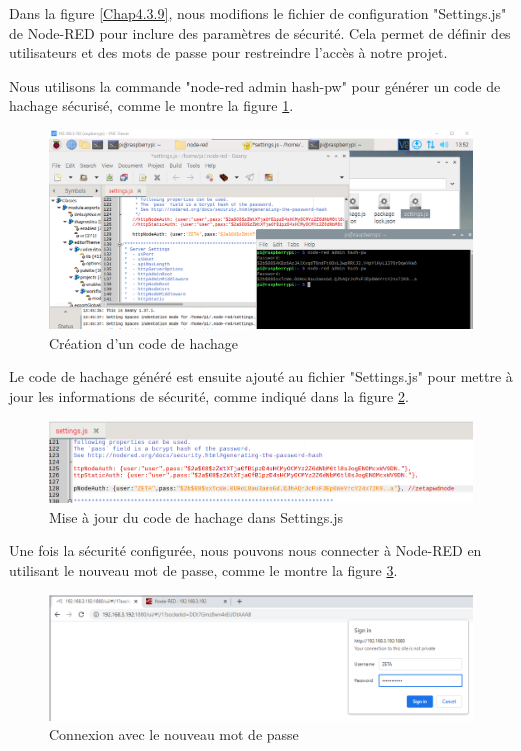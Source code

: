 Dans la figure \ref{Chap4.3.9}, nous modifions le fichier de configuration "Settings.js" de Node-RED pour inclure des paramètres de sécurité. Cela permet de définir des utilisateurs et des mots de passe pour restreindre l'accès à notre projet.

Nous utilisons la commande "node-red admin hash-pw" pour générer un code de hachage sécurisé, comme le montre la figure \ref{Chap4.3.10}.

\begin{figure}[H]
\centering
\includegraphics[width=15cm]{Images/Node-3.png}
\caption{Création d'un code de hachage}
\label{Chap4.3.10}
\end{figure}

Le code de hachage généré est ensuite ajouté au fichier "Settings.js" pour mettre à jour les informations de sécurité, comme indiqué dans la figure \ref{Chap4.3.11}.

\begin{figure}[H]
\centering
\includegraphics[width=15cm]{Images/Node-4.png}
\caption{Mise à jour du code de hachage dans Settings.js}
\label{Chap4.3.11}
\end{figure}

Une fois la sécurité configurée, nous pouvons nous connecter à Node-RED en utilisant le nouveau mot de passe, comme le montre la figure \ref{Chap4.3.12}.

\begin{figure}[H]
\centering
\includegraphics[width=15cm]{Images/Node-5.png}
\caption{Connexion avec le nouveau mot de passe}
\label{Chap4.3.12}
\end{figure}


